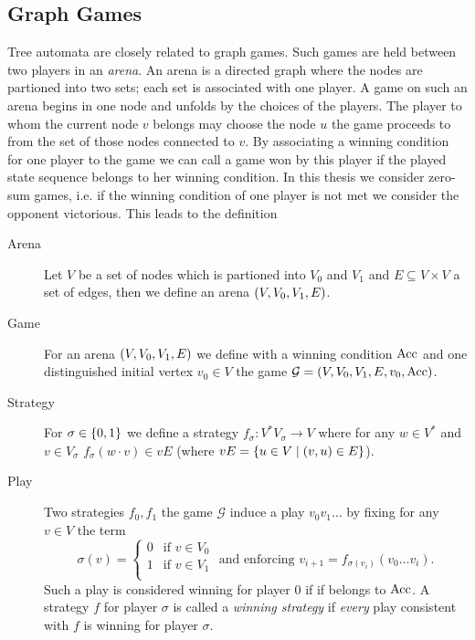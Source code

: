 \subsection{Graph Games}
Tree automata are closely related to graph games. Such
games are held between two players in an \emph{arena}. An arena is a directed
graph where the nodes are partioned into two sets; each set is associated with
one player. A game on such an arena begins in one node and unfolds by the
choices of the players. The player to whom the current node $v$ belongs may
choose the node $u$ the game proceeds to from the set of those nodes connected
to $v$. By associating a winning condition for one player to the game we can
call a game won by this player if the played state sequence belongs to her
winning condition. In this thesis we consider zero-sum games, i.e. if the
winning condition of one player is not met we consider the opponent victorious.
This leads to the definition
\begin{definition}
  \begin{description}
    \item [Arena] Let $V$ be a set of nodes which is partioned into $V_{0}$ and
      $V_{1}$ and $E\subseteq V\times V$ a set of edges, then we define an
      arena $\left(V, V_{0}, V_{1}, E\right)$.
    \item [Game] For an arena $\left(V, V_{0}, V_{1}, E\right)$ we define with a
      winning condition $\operatorname{Acc}$ and one distinguished initial vertex
      $v_{0}\in V$ the game
      $\mathcal{G} = \left(V, V_{0}, V_{1}, E, v_{0}, \operatorname{Acc}\right)$.
    \item [Strategy] For $\sigma\in\left\{0,1\right\}$ we define a strategy
      $f_{\sigma}: V^{*}V_{\sigma}\rightarrow V$ where for any $w\in V^{*}$ and
      $v\in V_{\sigma}$ $f_{\sigma}(w\cdot v)\in vE$ (where $vE =
      \left\{u\in V\mid\left(v,u\right)\in E\right\}$).
    \item [Play] Two strategies $f_{0}, f_{1}$ the game $\mathcal{G}$
      induce a play $v_{0}v_{1}\dots$ by fixing for any $v\in V$ the term
      \begin{equation*}
        \sigma(v) = \begin{cases}
          0&\text{if }v\in V_{0}\\
          1&\text{if }v\in V_{1}\\
        \end{cases}\text{ and enforcing }
        v_{i+1} = f_{\sigma(v_{i})}(v_{0}\dots v_{i}).
      \end{equation*}
      Such a play is considered winning for player $0$ if if belongs to $\operatorname{Acc}$.
      A strategy $f$ for player $\sigma$ is called a \emph{winning strategy} if
      \emph{every} play consistent with $f$ is winning for player $\sigma$.

  \end{description}
\end{definition}

